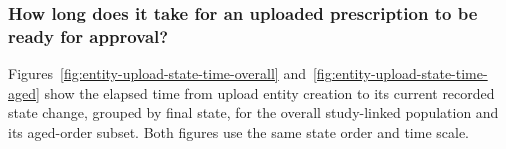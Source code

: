 \subsubsection{How long does it take for an uploaded prescription to be ready for approval?}
\label{subsec:entity-upload-analysis}
Figures~\ref{fig:entity-upload-state-time-overall}
and~\ref{fig:entity-upload-state-time-aged} show the elapsed time from
upload entity creation to its current recorded state change, grouped by final
state, for the overall study-linked population and its aged-order subset.
Both figures use the same state order and time scale.










\clearpage
\linenumbers

\clearpage
\nolinenumbers

